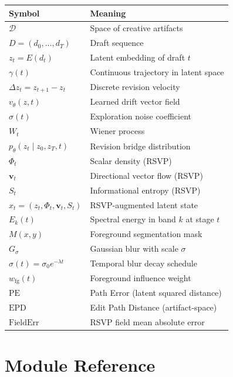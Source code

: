 \documentclass[12pt,a4paper]{article}
\theoremstyle{draftthm}
\newcommand{\D}{\mathcal{D}}
\newcommand{\traj}{\gamma}
\newcommand{\enc}{E}
\newcommand{\vtheta}{v_{\theta}}
\newcommand{\ptheta}{p_{\theta}}
\newcommand{\dz}{\Delta z}
\newcommand{\bW}{W}
\begin{document}
\begin{center}
\begin{tabular}{ll}
\toprule
Symbol & Meaning \\
\midrule
$\D$ & Space of creative artifacts \\
$D = (d_0, \dots, d_T)$ & Draft sequence \\
$z_t = \enc(d_t)$ & Latent embedding of draft $t$ \\
$\traj(t)$ & Continuous trajectory in latent space \\
$\dz_t = z_{t+1}-z_t$ & Discrete revision velocity \\
$\vtheta(z,t)$ & Learned drift vector field \\
$\sigma(t)$ & Exploration noise coefficient \\
$\bW_t$ & Wiener process \\
$\ptheta(z_t \mid z_0, z_T, t)$ & Revision bridge distribution \\
$\Phi_t$ & Scalar density (RSVP) \\
$\mathbf{v}_t$ & Directional vector flow (RSVP) \\
$S_t$ & Informational entropy (RSVP) \\
$x_t = (z_t, \Phi_t, \mathbf{v}_t, S_t)$ & RSVP-augmented latent state \\
$E_k(t)$ & Spectral energy in band $k$ at stage $t$ \\
$M(x,y)$ & Foreground segmentation mask \\
$G_\sigma$ & Gaussian blur with scale $\sigma$ \\
$\sigma(t) = \sigma_0 e^{-\lambda t}$ & Temporal blur decay schedule \\
$w_{\mathrm{fg}}(t)$ & Foreground influence weight \\
$\mathrm{PE}$ & Path Error (latent squared distance) \\
$\mathrm{EPD}$ & Edit Path Distance (artifact-space) \\
$\mathrm{FieldErr}$ & RSVP field mean absolute error \\
\bottomrule
\end{tabular}
\end{center}

\section{Module Reference}
\label{sec:module-ref}
\end{document}

